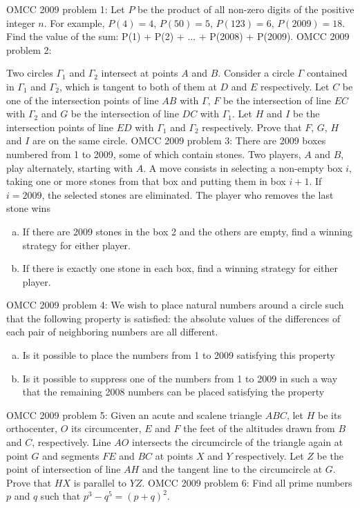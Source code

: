 OMCC 2009 problem 1:  Let $ P$ be the product of all non-zero digits of the positive integer $ n$. For example, $ P(4) = 4$, $ P(50) = 5$, $ P(123) = 6$, $ P(2009) = 18$. \\
Find the value of the sum: P(1) + P(2) + ... + P(2008) + P(2009). 
OMCC 2009 problem 2:  \item Two circles $ \Gamma_1$ and $ \Gamma_2$ intersect at points $ A$ and $ B$. Consider a circle $ \Gamma$ contained in $ \Gamma_1$ and $ \Gamma_2$, which is tangent to both of them at $ D$ and $ E$ respectively. Let $ C$ be one of the intersection points of line $ AB$ with $ \Gamma$, $ F$ be the intersection of line $ EC$ with $ \Gamma_2$ and $ G$ be the intersection of line $ DC$ with $ \Gamma_1$. Let $ H$ and $ I$ be the intersection points of line $ ED$ with $ \Gamma_1$ and $ \Gamma_2$ respectively. Prove that $ F$, $ G$, $ H$ and $ I$ are on the same circle. 
OMCC 2009 problem 3:  There are 2009 boxes numbered from 1 to 2009, some of which contain stones. Two players, $ A$ and $ B$, play alternately, starting with $ A$. A move consists in selecting a non-empty box $ i$, taking one or more stones from that box and putting them in box $ i + 1$. If $ i = 2009$, the selected stones are eliminated. The player who removes the last stone wins
\begin{enumerate}[a)]
  \item If there are 2009 stones in the box 2 and the others are empty, find a winning strategy for either player.
  \item If there is exactly one stone in each box, find a winning strategy for either player.
\end{enumerate} 
OMCC 2009 problem 4:  We wish to place natural numbers around a circle such that the following property is satisfied: the absolute values of the differences of each pair of neighboring numbers are all different.
\begin{enumerate}[a)]
  \item Is it possible to place the numbers from 1 to 2009 satisfying this property
  \item Is it possible to suppress one of the numbers from 1 to 2009 in such a way that the remaining 2008 numbers can be placed satisfying the property
\end{enumerate} 
OMCC 2009 problem 5:  Given an acute and scalene triangle $ ABC$, let $ H$ be its orthocenter, $ O$ its circumcenter, $ E$ and $ F$ the feet of the altitudes drawn from $ B$ and $ C$, respectively. Line $ AO$ intersects the circumcircle of the triangle again at point $ G$ and segments $ FE$ and $ BC$ at points $ X$ and $ Y$ respectively. Let $ Z$ be the point of intersection of line $ AH$ and the tangent line to the circumcircle at $ G$. Prove that $ HX$ is parallel to $ YZ$. 
OMCC 2009 problem 6:  Find all prime numbers $ p$ and $ q$ such that $ p^3 - q^5 = (p + q)^2$. 

